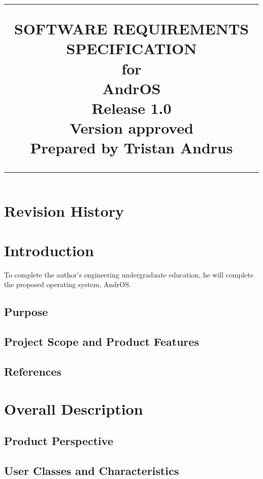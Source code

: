 \documentclass{scrreprt}
\title{%
\flushright
\rule{16cm}{5pt}\vskip1cm
\Huge{SOFTWARE REQUIREMENTS\\ SPECIFICATION}\\
\vspace{2cm}
for\\
\vspace{2cm}
AndrOS\\
\vspace{2cm}
\LARGE{Release 1.0\\}
\vspace{2cm}
\LARGE{Version \myversion approved\\}
\vspace{2cm}
Prepared by Tristan Andrus\\
\vfill
\rule{16cm}{5pt}
}
\date{}
\begin{document}
\maketitle
\tableofcontents
\chapter*{Revision History}
\chapter{Introduction}
To complete the author's engineering undergraduate education, he will complete the proposed operating system, AndrOS.
\section{Purpose}
\section{Project Scope and Product Features}
\section{References}
\chapter{Overall Description}
\section{Product Perspective}
\section{User Classes and Characteristics}
\end{document}
